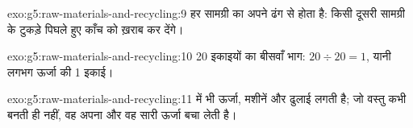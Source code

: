 \begin{solution}{exo:g5:raw-materials-and-recycling:9}
हर सामग्री का  अपने ढंग से होता है: किसी दूसरी सामग्री के टुकड़े
पिघले हुए काँच को ख़राब कर देंगे।
\end{solution}

\begin{solution}{exo:g5:raw-materials-and-recycling:10}
20 इकाइयों का बीसवाँ भाग: $20 \div 20 = 1$, यानी लगभग ऊर्जा की 1 इकाई।
\end{solution}

\begin{solution}{exo:g5:raw-materials-and-recycling:11}
 में भी ऊर्जा, मशीनें और ढुलाई लगती है; जो वस्तु कभी बनती ही नहीं,
वह अपना  और वह सारी ऊर्जा बचा लेती है।
\end{solution}

